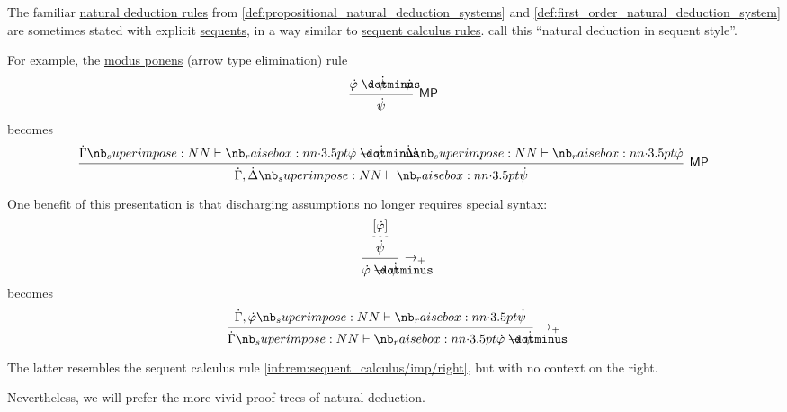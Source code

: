 \begin{remark}\label{rem:natural_deduction_explicit_sequents}
  The familiar \hyperref[def:natural_deduction_rule]{natural deduction rules} from \cref{def:propositional_natural_deduction_systems} and \cref{def:first_order_natural_deduction_system} are sometimes stated with explicit \hyperref[def:sequent]{sequents}, in a way similar to \hyperref[def:sequent_calculus_rule]{sequent calculus rules}.  call this \enquote{natural deduction in sequent style}.

  For example, the \hyperref[thm:axiomatic_derivation_as_natural_deduction/mp]{modus ponens} (arrow type elimination) rule
  \begin{equation*}
    \begin{prooftree}
      \hypo{ \syn\varphi \synimplies \syn\psi }
      \hypo{ \syn\varphi }
      \infer2[\ensuremath{ \logic{MP} }]{ \syn\psi }
    \end{prooftree}
  \end{equation*}
  becomes
  \begin{equation*}
    \begin{prooftree}
      \hypo{ \syn\Gamma \synvdash \syn\varphi \synimplies \syn\psi }
      \hypo{ \syn\Delta \synvdash \syn\varphi }
      \infer2[\ensuremath{ \logic{MP} }]{ \syn\Gamma, \syn\Delta \synvdash \syn\psi }
    \end{prooftree}
  \end{equation*}

  One benefit of this presentation is that discharging assumptions no longer requires special syntax:
  \begin{equation*}
    \begin{prooftree}
      \hypo{ [\syn\varphi] }
      \infer[dashed]1{ \syn\psi }
      \infer1[\ensuremath{ \rightarrow_+ }]{ \syn\varphi \synimplies \syn\psi }
    \end{prooftree}
  \end{equation*}
  becomes
  \begin{equation*}
    \begin{prooftree}
      \hypo{ \syn\Gamma, \syn\varphi \synvdash \syn\psi }
      \infer1[\ensuremath{ \rightarrow_+ }]{ \syn\Gamma \synvdash \syn\varphi \synimplies \syn\psi }
    \end{prooftree}
  \end{equation*}

  The latter resembles the sequent calculus rule \ref{inf:rem:sequent_calculus/imp/right}, but with no context on the right.

  Nevertheless, we will prefer the more vivid proof trees of natural deduction.
\end{remark}
